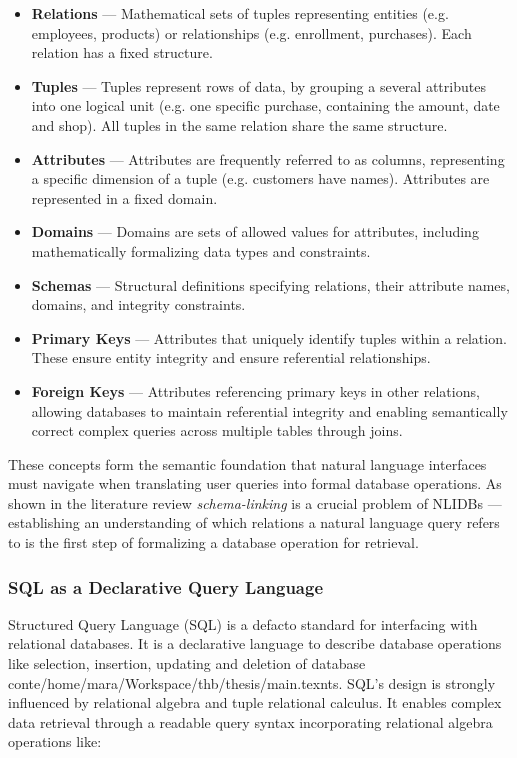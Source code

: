 \begin{itemize}
    \item \textbf{Relations} — Mathematical sets of tuples representing entities (e.g. employees, products) or
          relationships (e.g. enrollment, purchases). Each relation has a fixed structure.
    \item \textbf{Tuples} — Tuples represent rows of data, by grouping a several attributes into one logical unit
          (e.g. one specific purchase, containing the amount, date and shop). All tuples in the same relation share
          the same structure.
    \item \textbf{Attributes} — Attributes are frequently referred to as columns, representing a specific dimension
          of a tuple (e.g. customers have names). Attributes are represented in a fixed domain.
    \item \textbf{Domains} — Domains are sets of allowed values for attributes, including mathematically formalizing
          data types and constraints.
    \item \textbf{Schemas} — Structural definitions specifying relations, their attribute names, domains, and integrity
          constraints.
    \item \textbf{Primary Keys} — Attributes that uniquely identify tuples within a relation. These
          ensure entity integrity and ensure referential relationships.
    \item \textbf{Foreign Keys} — Attributes referencing primary keys in other relations, allowing databases to maintain
          referential integrity and enabling semantically correct complex queries across multiple tables through joins.
\end{itemize}

These concepts form the semantic foundation that natural language interfaces must navigate when translating user queries
into formal database operations. As shown in the literature review \textit{schema-linking} is a crucial problem of
NLIDBs — establishing an understanding of which relations a natural language query refers to is the first step of
formalizing a database operation for retrieval.

\subsubsection{SQL as a Declarative Query Language}

Structured Query Language (SQL) is a defacto standard for interfacing with relational databases. It is a declarative
language to describe database operations like selection, insertion, updating and deletion of database conte/home/mara/Workspace/thb/thesis/main.texnts. SQL's
design is strongly influenced by relational algebra and tuple relational calculus. It enables complex data retrieval
through a readable query syntax incorporating relational algebra operations like:

